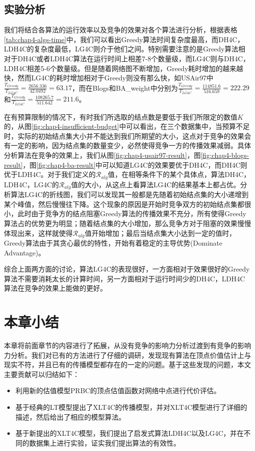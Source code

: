 \subsection{实验分析}
我们将结合各算法的运行效率以及竞争的效果对各个算法进行分析，根据表格\ref{tab:chap4-algs-time}中，我们可以看出Greedy算法时间复杂度最高，而DH4C，LDH4C的复杂度最低，LG4C则介于他们之间。特别需要注意的是Greedy算法相对于DH4C或者LDH4C算法在运行时间上相差7-8个数量级，而LG4C则与DH4C，LDH4C相差5-6个数量级。但是随着网络图不断增加，Greedy耗时增加的越来越快，然而LG4C的耗时增加相对于Greedy则没有那么快，如USAir97中$\frac{T_{Greedy}}{T_{LG4C}}=\frac{2656.336}{42.0492}=63.17$，而在Blogs和BA\_weight中分别为$\frac{T_{Greedy}}{T_{LG4C}}=\frac{114851.6}{516.659}=222.29$和$\frac{T_{Greedy}}{T_{LG4C}}=\frac{108265.7}{511.642}=211.6$。


在有预算限制的情况下，有时我们所选取的结点数是要低于我们所限定的数值$K$的，从图\ref{fig:chap4-insufficient-budget}中可以看出，在三个数据集中，当预算不足时，实际的初始结点集大小并不能达到我们所期望的大小，这点对于竞争的效果会有一定的影响，因为结点集的数量变少，必然使得竞争一方的传播效果减弱。具体分析算法在竞争的效果上，我们从图\ref{fig:chap4-usair97-result}，图\ref{fig:chap4-blogs-result}，图\ref{fig:chap4-ba-result}中可以知道LG4C的效果要优于DH4C，而DH4C则优于LDH4C。对于我们定义的$\mathcal{R}_{alg}$值，在相等条件下的某个具体点，算法DH4C，LDH4C，LG4C的$\mathcal{R}_{alg}$值的大小，从这点上看算法LG4C的结果基本上都占优。分析算法LG4C的折线图，我们可以发现其一般都是先随着初始结点集的大小递增到某个峰值，然后慢慢往下降。这个现象的原因是开始时竞争双方的初始结点集都很小，此时由于竞争方的结点阻塞Greedy算法的传播效果不充分，所有使得Greedy算法占的优势更为明显；随着结点集的大小增加，那么竞争方对于阻塞的效果慢慢体现出来，这样就使得$\mathcal{R}_{alg}$值开始增加；最后当结点集大小达到一定的值时，Greedy算法由于其贪心最优的特性，开始有着稳定的主导优势(Dominate Advantage)。

综合上面两方面的讨论，算法LG4C的表现很好，一方面相对于效果很好的Greedy算法不需要消耗太长的计算时间，另一方面相对于运行时间少的DH4C，LDH4C算法在竞争的效果上能做的更好。


\section{本章小结}
本章将前面章节的内容进行了拓展，从没有竞争的影响力分析过渡到有竞争的影响力分析。我们对已有的方法进行了仔细的调研，发现现有算法在顶点价值估计上与现实不符，并且已有的传播模型都存在的一定的问题。基于这些发现的问题，本文主要贡献可以归结如下：
\begin{itemize}
\item 利用新的估值模型PRBC的顶点估值函数对网络中点进行代价评估。
\item 基于经典的LT模型提出了XLT4C的传播模型，并对XLT4C模型进行了详细的描述，然后给出了相应的模型算法。
\item 基于新提出的XLT4C模型，我们提出了启发式算法LDH4C以及LG4C，并在不同的数据集上进行实验，证实我们提出算法的有效性。
\end{itemize}